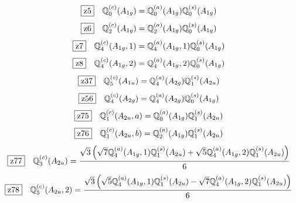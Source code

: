 \documentclass[fleqn,10pt,landscape]{jsarticle}
\begin{document}
\begin{dmath*}
\hspace*{3mm}\fbox{z5}\quad \mathbb{Q}_{0}^{(c)}(A_{1g})=\mathbb{Q}_{0}^{(a)}(A_{1g}) \mathbb{Q}_{0}^{(s)}(A_{1g})
\end{dmath*}
\begin{dmath*}
\hspace*{3mm}\fbox{z6}\quad \mathbb{Q}_{2}^{(c)}(A_{1g})=\mathbb{Q}_{2}^{(a)}(A_{1g}) \mathbb{Q}_{0}^{(s)}(A_{1g})
\end{dmath*}
\begin{dmath*}
\hspace*{3mm}\fbox{z7}\quad \mathbb{Q}_{4}^{(c)}(A_{1g},1)=\mathbb{Q}_{4}^{(a)}(A_{1g},1) \mathbb{Q}_{0}^{(s)}(A_{1g})
\end{dmath*}
\begin{dmath*}
\hspace*{3mm}\fbox{z8}\quad \mathbb{Q}_{4}^{(c)}(A_{1g},2)=\mathbb{Q}_{4}^{(a)}(A_{1g},2) \mathbb{Q}_{0}^{(s)}(A_{1g})
\end{dmath*}
\begin{dmath*}
\hspace*{3mm}\fbox{z37}\quad \mathbb{Q}_{5}^{(c)}(A_{1u})=\mathbb{Q}_{4}^{(a)}(A_{2g}) \mathbb{Q}_{1}^{(s)}(A_{2u})
\end{dmath*}
\begin{dmath*}
\hspace*{3mm}\fbox{z56}\quad \mathbb{Q}_{4}^{(c)}(A_{2g})=\mathbb{Q}_{4}^{(a)}(A_{2g}) \mathbb{Q}_{0}^{(s)}(A_{1g})
\end{dmath*}
\begin{dmath*}
\hspace*{3mm}\fbox{z75}\quad \mathbb{Q}_{1}^{(c)}(A_{2u},a)=\mathbb{Q}_{0}^{(a)}(A_{1g}) \mathbb{Q}_{1}^{(s)}(A_{2u})
\end{dmath*}
\begin{dmath*}
\hspace*{3mm}\fbox{z76}\quad \mathbb{Q}_{1}^{(c)}(A_{2u},b)=\mathbb{Q}_{2}^{(a)}(A_{1g}) \mathbb{Q}_{1}^{(s)}(A_{2u})
\end{dmath*}
\begin{dmath*}
\hspace*{3mm}\fbox{z77}\quad \mathbb{Q}_{3}^{(c)}(A_{2u})=\frac{\sqrt{3} \left(\sqrt{7} \mathbb{Q}_{4}^{(a)}(A_{1g},1) \mathbb{Q}_{1}^{(s)}(A_{2u}) + \sqrt{5} \mathbb{Q}_{4}^{(a)}(A_{1g},2) \mathbb{Q}_{1}^{(s)}(A_{2u})\right)}{6}
\end{dmath*}
\begin{dmath*}
\hspace*{3mm}\fbox{z78}\quad \mathbb{Q}_{5}^{(c)}(A_{2u},2)=\frac{\sqrt{3} \left(\sqrt{5} \mathbb{Q}_{4}^{(a)}(A_{1g},1) \mathbb{Q}_{1}^{(s)}(A_{2u}) - \sqrt{7} \mathbb{Q}_{4}^{(a)}(A_{1g},2) \mathbb{Q}_{1}^{(s)}(A_{2u})\right)}{6}
\end{dmath*}
\end{document}
